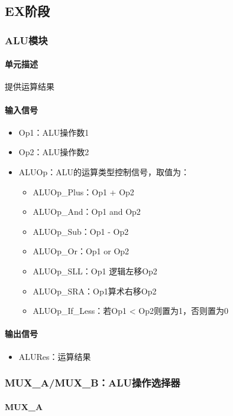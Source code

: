 \documentclass{article}
\begin{document}
\subsection{EX阶段}

\subsubsection{ALU模块}

\paragraph{单元描述}

提供运算结果

\paragraph{输入信号}
\begin{itemize}
	\item Op1：ALU操作数1
	\item Op2：ALU操作数2 
	\item ALUOp：ALU的运算类型控制信号，取值为：
		\begin{itemize}
		\item ALUOp\_Plus：Op1 + Op2
		\item ALUOp\_And：Op1 and Op2
		\item ALUOp\_Sub：Op1 - Op2
		\item ALUOp\_Or：Op1 or Op2
		\item ALUOp\_SLL：Op1 逻辑左移Op2
		\item ALUOp\_SRA：Op1算术右移Op2
		\item ALUOp\_If\_Less：若Op1 < Op2则置为1，否则置为0
		\end{itemize}
\end{itemize}


\paragraph{输出信号}
\begin{itemize}
	\item ALURes：运算结果
\end{itemize}
	
\subsubsection{MUX\_A/MUX\_B：ALU操作选择器}
	
\paragraph{MUX\_A}
	
\end{document}

